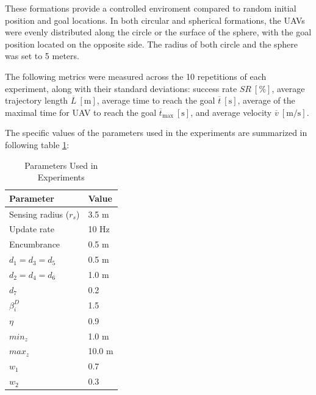         These formations provide a controlled enviroment compared to random initial position and goal locations. 
        In both circular and spherical formations, the \ac{UAV}s were evenly distributed along the circle or the surface of the sphere, with the goal position located on the opposite side.
        The radius of both circle and the sphere was set to 5 meters.
        
        The following metrics were measured across the 10 repetitions of each experiment, along with their standard deviations: success rate \( SR \ [\%] \), average trajectory length \( \overline{L} \ [\mathrm{m}] \), 
        average time to reach the goal \( \overline{t} \ [\mathrm{s}] \), average of the maximal time for \ac{UAV} to reach the goal \( \overline{t}_{\text{max}} \ [\mathrm{s}] \), and average velocity \( \overline{v} \ [\mathrm{m/s}] \).

        The specific values of the parameters used in the experiments are summarized in following table \ref{tab:experiment_parameters}:
        \begin{table}[H]
            \centering
            \caption{Parameters Used in Experiments}
            \begin{tabular}{|l|l|}
                \hline
                Parameter & Value \\
                \hline
                \hline
                Sensing radius ($r_s$) & 3.5 m \\ \hline
                Update rate & 10 Hz \\ \hline
                Encumbrance & 0.5 m \\ \hline
                $d_1 = d_3 = d_5$ & 0.5 m \\ \hline
                $d_2 = d_4 = d_6$ & 1.0 m \\ \hline
                $d_7$ & 0.2  \\ \hline
                $\beta_i^D$ & 1.5  \\ \hline
                $\eta$ & 0.9  \\ \hline
                $min_z$ & 1.0 m \\ \hline
                $max_z$ & 10.0 m \\ \hline
                $w_1$ & 0.7 \\ \hline
                $w_2$ & 0.3 \\ \hline

            \end{tabular}
            \label{tab:experiment_parameters}
        \end{table}

